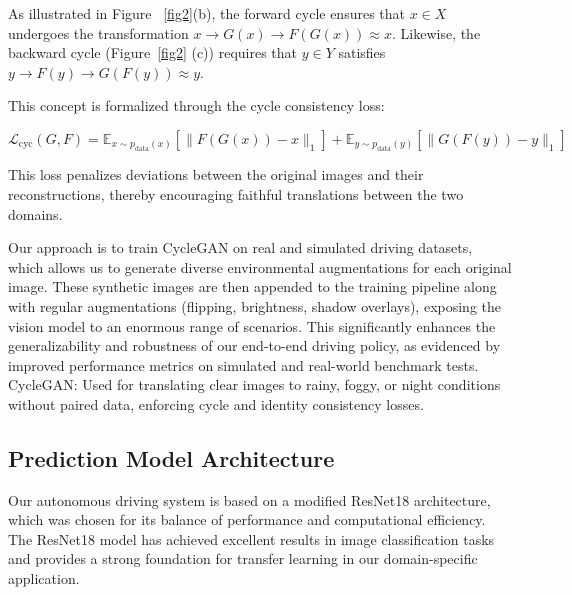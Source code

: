\documentclass[pdflatex,sn-mathphys-num]{sn-jnl}%
\theoremstyle{thmstyleone}%
\theoremstyle{thmstyletwo}%
\theoremstyle{thmstylethree}%
\begin{document}
As illustrated in Figure~ \ref{fig2}(b), the forward cycle ensures that \( x \in X \) undergoes the transformation \( x \rightarrow G(x) \rightarrow F(G(x)) \approx x \). Likewise, the backward cycle (Figure~\ref{fig2} (c)) requires that \( y \in Y \) satisfies \( y \rightarrow F(y) \rightarrow G(F(y)) \approx y \).

This concept is formalized through the cycle consistency loss:

\[
\mathcal{L}_{\text{cyc}}(G, F) = \mathbb{E}_{x \sim p_{\text{data}}(x)}[\|F(G(x)) - x\|_1] + \mathbb{E}_{y \sim p_{\text{data}}(y)}[\|G(F(y)) - y\|_1] \tag{2}
\]

This loss penalizes deviations between the original images and their reconstructions, thereby encouraging faithful translations between the two domains.


Our approach is to train CycleGAN on real and simulated driving datasets, which allows us to generate diverse environmental augmentations for each original image. These synthetic images are then appended to the training pipeline along with regular augmentations (flipping, brightness, shadow overlays), exposing the vision model to an enormous range of scenarios. This significantly enhances the generalizability and robustness of our end-to-end driving policy, as evidenced by improved performance metrics on simulated and real-world benchmark tests.
CycleGAN: Used for translating clear images to rainy, foggy, or night conditions without paired data, enforcing cycle and identity consistency losses.


\subsection{Prediction Model Architecture}
Our autonomous driving system is based on a modified ResNet18 architecture, which was chosen for its balance of performance and computational efficiency. The ResNet18 model has achieved excellent results in image classification tasks and provides a strong foundation for transfer learning in our domain-specific application.
\end{document}
